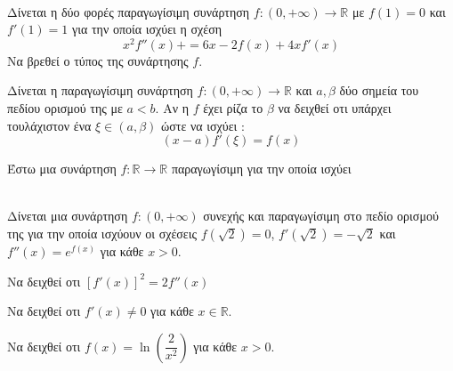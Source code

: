 \documentclass[ektypwsh]{diag-pan-xelatex}
\begin{document}
\begin{thema}
\begin{erwthma}
\end{erwthma}
\item \mbox{}\\
\vspace{-5mm}
\begin{erwthma}
\item Δίνεται η δύο φορές παραγωγίσιμη συνάρτηση $ f:(0,+\infty)\rightarrow\mathbb{R} $ με $ f(1)=0 $ και $ f'(1)=1 $ για την οποία ισχύει η σχέση \[ x^2f''(x)+=6x-2f(x)+4xf'(x) \]
Να βρεθεί ο τύπος της συνάρτησης $ f $.
\item Δίνεται η παραγωγίσιμη συνάρτηση $ f:(0,+\infty)\rightarrow\mathbb{R} $ και $ a,\beta $ δύο σημεία του πεδίου ορισμού της με $ a<b $. Αν η $ f $ έχει ρίζα το $ \beta $ να δειχθεί οτι υπάρχει τουλάχιστον ένα $ \xi\in(a,\beta) $ ώστε να ισχύει : \[ (x-a)f'(\xi)=f(x) \]
\item Έστω μια συνάρτηση $ f:\mathbb{R}\rightarrow\mathbb{R} $ παραγωγίσιμη για την οποία ισχύει 
\end{erwthma}
\item \mbox{}\\
Δίνεται μια συνάρτηση $ f:(0,+\infty) $ συνεχής και παραγωγίσιμη στο πεδίο ορισμού της για την οποία ισχύουν οι σχέσεις $ f(\sqrt{2})=0 $, $ f'(\sqrt{2})=-\sqrt{2} $ και $ f''(x)=e^{f(x)} $ για κάθε $ x>0 $.
\begin{erwthma}
\item Να δειχθεί οτι  $ \left[ f'(x)\right]^2=2f''(x)  $
\item Να δειχθεί οτι $ f'(x)\neq0 $ για κάθε $ x\in\mathbb{R} $.
\item Να δειχθεί οτι $ f(x)=\ln{\left( \dfrac{2}{x^2}\right) } $ για κάθε $ x>0 $.
\end{erwthma}
\end{thema}
\end{document}
